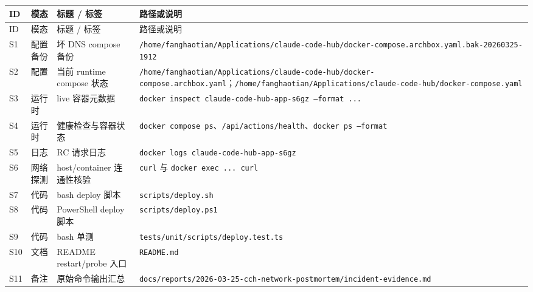 \documentclass[a4paper]{article}
\newcommand{\filepath}[1]{\nolinkurl{#1}}
\begin{document}
\begin{longtable}{p{1.0cm}p{1.8cm}p{4.2cm}p{7.3cm}}
\toprule
ID & 模态 & 标题 / 标签 & 路径或说明 \\
\midrule
\endfirsthead
\toprule
ID & 模态 & 标题 / 标签 & 路径或说明 \\
\midrule
\endhead
S1 & 配置备份 & 坏 DNS compose 备份 & \filepath{/home/fanghaotian/Applications/claude-code-hub/docker-compose.archbox.yaml.bak-20260325-1912} \\
S2 & 配置 & 当前 runtime compose 状态 & \filepath{/home/fanghaotian/Applications/claude-code-hub/docker-compose.archbox.yaml}；\filepath{/home/fanghaotian/Applications/claude-code-hub/docker-compose.yaml} \\
S3 & 运行时 & live 容器元数据 & \texttt{docker inspect claude-code-hub-app-s6gz --format ...} \\
S4 & 运行时 & 健康检查与容器状态 & \texttt{docker compose ps}、\texttt{/api/actions/health}、\texttt{docker ps --format} \\
S5 & 日志 & RC 请求日志 & \texttt{docker logs claude-code-hub-app-s6gz} \\
S6 & 网络探测 & host/container 连通性核验 & \texttt{curl} 与 \texttt{docker exec ... curl} \\
S7 & 代码 & bash deploy 脚本 & \filepath{scripts/deploy.sh} \\
S8 & 代码 & PowerShell deploy 脚本 & \filepath{scripts/deploy.ps1} \\
S9 & 代码 & bash 单测 & \filepath{tests/unit/scripts/deploy.test.ts} \\
S10 & 文档 & README restart/probe 入口 & \filepath{README.md} \\
S11 & 备注 & 原始命令输出汇总 & \filepath{docs/reports/2026-03-25-cch-network-postmortem/incident-evidence.md} \\
\bottomrule
\end{longtable}
\end{document}
